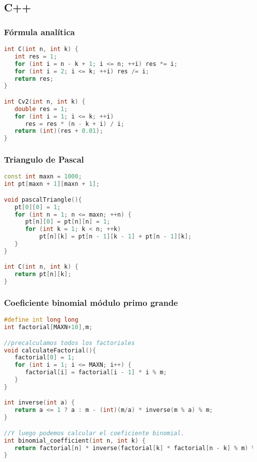 \subsection{C++}
\subsubsection{Fórmula analítica}
\begin{lstlisting}[language=C++]
int C(int n, int k) {
   int res = 1;
   for (int i = n - k + 1; i <= n; ++i) res *= i;
   for (int i = 2; i <= k; ++i) res /= i;
   return res;
}

int Cv2(int n, int k) {
   double res = 1;
   for (int i = 1; i <= k; ++i)
      res = res * (n - k + i) / i;
   return (int)(res + 0.01);
}	
\end{lstlisting}


\subsubsection{Triangulo de Pascal}
\begin{lstlisting}[language=C++]
const int maxn = 1000;
int pt[maxn + 1][maxn + 1];

void pascalTriangle(){
   pt[0][0] = 1;
   for (int n = 1; n <= maxn; ++n) {
      pt[n][0] = pt[n][n] = 1;
      for (int k = 1; k < n; ++k)
          pt[n][k] = pt[n - 1][k - 1] + pt[n - 1][k];
   }
}

int C(int n, int k) {
   return pt[n][k];
}

\end{lstlisting}

\subsubsection{Coeficiente binomial módulo primo grande}
\begin{lstlisting}[language=C++]
#define int long long
int factorial[MAXN+10],m;

//precalculamos todos los factoriales
void calculateFactorial(){
   factorial[0] = 1;
   for (int i = 1; i <= MAXN; i++) {
      factorial[i] = factorial[i - 1] * i % m;
   }
}

int inverse(int a) {
   return a <= 1 ? a : m - (int)(m/a) * inverse(m % a) % m;
}	

//Y luego podemos calcular el coeficiente binomial.
int binomial_coefficient(int n, int k) {
   return factorial[n] * inverse(factorial[k] * factorial[n - k] % m) % m;
}
	
\end{lstlisting}

